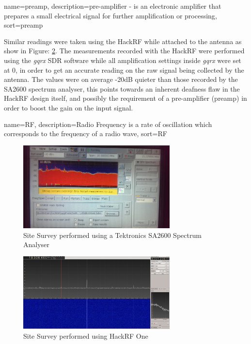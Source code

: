 \documentclass[runningheads,a4paper]{llncs}
\begin{document}
{
  name={preamp},
  description={pre-amplifier - is an electronic amplifier that prepares a small electrical signal for further amplification or processing},
  sort=preamp
}

Similar readings were taken using the HackRF while attached to the antenna as show in Figure: \ref{fig:site_survey_hackrf}. The measurements recorded with the HackRF were performed using the \textit{gqrx} \gls{SDR} software while all amplification settings inside \textit{gqrx} were set at 0, in order to get an accurate reading on the raw signal being collected by the antenna. The values were on average -20dB quieter than those recorded by the SA2600 spectrum analyser, this points towards an inherent deafness flaw in the HackRF design itself, and possibly the requirement of a pre-amplifier (\gls{preamp}) in order to boost the gain on the input signal. 

{
  name={RF},
  description={Radio Frequency is a rate of oscillation which corresponds to the frequency of a radio wave},
  sort=RF
}

%
\begin{figure}[here]
\centering
\includegraphics[width=8cm]{images/26}
\caption{Site Survey performed using a Tektronics SA2600 Spectrum Analyser}
\label{fig:site_survey_spec_analyser}
\end{figure}
%

%
\begin{figure}[here]
\centering
\includegraphics[width=8cm]{images/31}
\caption{Site Survey performed using HackRF One}
\label{fig:site_survey_hackrf}
\end{figure}
%
\end{document}
